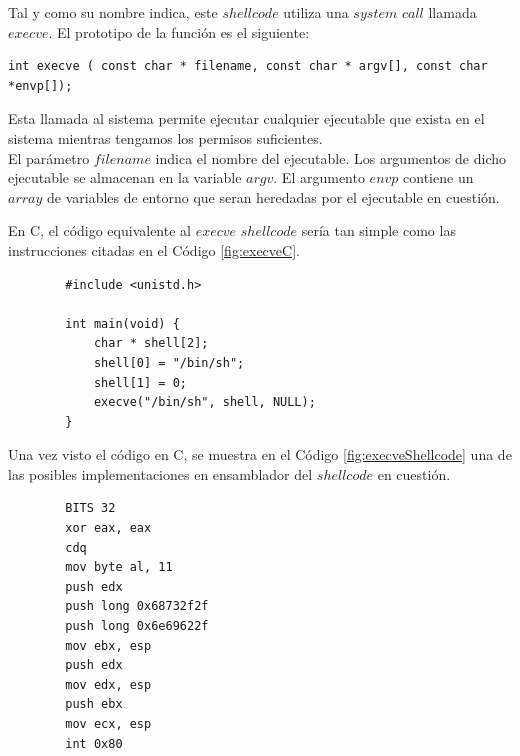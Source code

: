 \documentclass [titlepage, 12pt]{article}
\begin{document}
Tal y como su nombre indica, este $shellcode$ utiliza una $system$ $call$ llamada $execve$. El prototipo de la funci\'on es el siguiente:
\begin{center}
\begin{verbatim}int execve ( const char * filename, const char * argv[], const char *envp[]);\end{verbatim}
\end{center}
Esta llamada al sistema permite ejecutar cualquier ejecutable que exista en el sistema mientras tengamos los permisos suficientes.\\
El par\'ametro $filename$ indica el nombre del ejecutable. Los argumentos de dicho ejecutable se almacenan en la variable $argv$. El argumento $envp$ contiene un $array$ de variables de entorno que seran heredadas por el ejecutable en cuesti\'on.\bigskip

En C, el c\'odigo equivalente al $execve$ $shellcode$ ser\'ia tan simple como las instrucciones citadas en el C\'odigo \ref{fig:execveC}.

\lstset{language=C++,caption=$Execve$ $shellcode$ en C,label=fig:execveC}
\begin{lstlisting}	
		#include <unistd.h>
		
		int main(void) {
			char * shell[2];
			shell[0] = "/bin/sh";
			shell[1] = 0;
			execve("/bin/sh", shell, NULL);
		}
\end{lstlisting}

Una vez visto el c\'odigo en C, se muestra en el C\'odigo \ref{fig:execveShellcode} una de las posibles implementaciones en ensamblador del $shellcode$ en cuesti\'on.

\lstset{language=C++,caption=$Execve$ $shellcode$ en ensamblador,label=fig:execveShellcode}
\begin{lstlisting}	
		BITS 32
		xor eax, eax
		cdq
		mov byte al, 11
		push edx
		push long 0x68732f2f
		push long 0x6e69622f
		mov ebx, esp
		push edx
		mov edx, esp
		push ebx
		mov ecx, esp
		int 0x80
\end{lstlisting}
\end{document}
